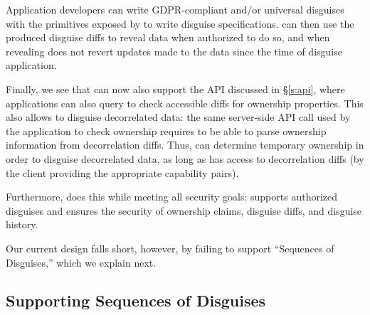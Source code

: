 Application developers can write GDPR-compliant and/or universal disguises with the primitives
exposed by \sys to write disguise specifications.
%
\sys can then use the produced disguise diffs to reveal data when authorized to do so, and when
revealing does not revert updates made to the data since the time of disguise application.

Finally, we see that \sys can now also support the API discussed in \S\ref{s:api}, where
applications can also query \sys to check accessible diffs for ownership properties.  This also
allows \sys to disguise decorrelated data: the same server-side API call used by the application to
check ownership requires \sys to be able to parse ownership information from decorrelation diffs.
Thus, \sys can determine temporary ownership in order to disguise decorrelated data, as long as \sys
has access to decorrelation diffs (by the client providing the appropriate capability pairs).

Furthermore, \sys does this while meeting all security goals: \sys supports authorized disguises and
ensures the security of ownership claims, disguise diffs, and disguise history.

Our current design falls short, however, by failing to support ``Sequences of Disguises,'' which we
explain next.


\subsection{Supporting Sequences of Disguises}

